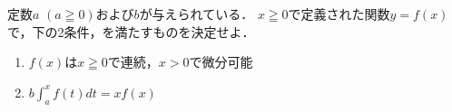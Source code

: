 \documentclass[../../main.tex]{subfiles}
\begin{document}
定数$a$ $(a\geqq0)$および$b$が与えられている．
$x\geqq0$で定義された関数$y=f(x)$で，下の2条件，を満たすものを決定せよ．
\begin{enumerate}
  \item $f(x)$は$x\geqq0$で連続，$x>0$で微分可能
  \item $\displaystyle b\int_a^x f(t)dt=xf(x)$
\end{enumerate}
\end{document}

